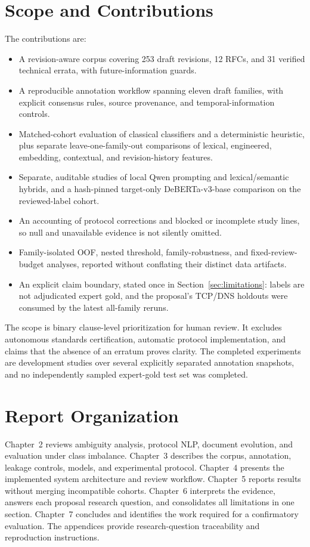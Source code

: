 \documentclass[12pt,a4paper,oneside]{report}
\begin{document}
\section{Scope and Contributions}

The contributions are:

\begin{itemize}
  \item A revision-aware corpus covering 253 draft revisions, 12 RFCs, and 31 verified technical errata, with future-information guards.
  \item A reproducible annotation workflow spanning eleven draft families, with explicit consensus rules, source provenance, and temporal-information controls.
  \item Matched-cohort evaluation of classical classifiers and a deterministic heuristic, plus separate leave-one-family-out comparisons of lexical, engineered, embedding, contextual, and revision-history features.
  \item Separate, auditable studies of local Qwen prompting and lexical/semantic hybrids, and a hash-pinned target-only DeBERTa-v3-base comparison on the reviewed-label cohort.
  \item An accounting of protocol corrections and blocked or incomplete study lines, so null and unavailable evidence is not silently omitted.
  \item Family-isolated OOF, nested threshold, family-robustness, and fixed-review-budget analyses, reported without conflating their distinct data artifacts.
  \item An explicit claim boundary, stated once in Section~\ref{sec:limitations}: labels are not adjudicated expert gold, and the proposal's TCP/DNS holdouts were consumed by the latest all-family reruns.
\end{itemize}

The scope is binary clause-level prioritization for human review. It excludes autonomous standards certification, automatic protocol implementation, and claims that the absence of an erratum proves clarity. The completed experiments are development studies over several explicitly separated annotation snapshots, and no independently sampled expert-gold test set was completed.

\section{Report Organization}

Chapter~2 reviews ambiguity analysis, protocol NLP, document evolution, and evaluation under class imbalance. Chapter~3 describes the corpus, annotation, leakage controls, models, and experimental protocol. Chapter~4 presents the implemented system architecture and review workflow. Chapter~5 reports results without merging incompatible cohorts. Chapter~6 interprets the evidence, answers each proposal research question, and consolidates all limitations in one section. Chapter~7 concludes and identifies the work required for a confirmatory evaluation. The appendices provide research-question traceability and reproduction instructions.
\end{document}
